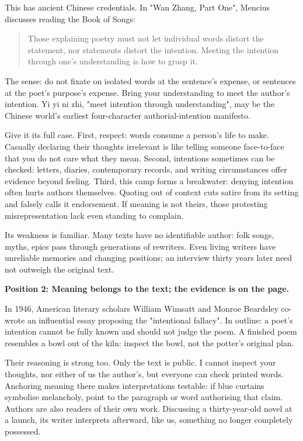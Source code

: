 This has ancient Chinese credentials. In "Wan Zhang, Part One", Mencius discusses reading the Book of Songs:

\begin{quote}
Those explaining poetry must not let individual words distort the statement, nor statements distort the intention. Meeting the intention through one's understanding is how to grasp it.
\end{quote}
The sense: do not fixate on isolated words at the sentence's expense, or sentences at the poet's purpose's expense. Bring your understanding to meet the author's intention. Yi yi ni zhi, "meet intention through understanding", may be the Chinese world's earliest four-character authorial-intention manifesto.

Give it its full case. First, respect: words consume a person's life to make. Casually declaring their thoughts irrelevant is like telling someone face-to-face that you do not care what they mean. Second, intentions sometimes can be checked: letters, diaries, contemporary records, and writing circumstances offer evidence beyond feeling. Third, this camp forms a breakwater: denying intention often hurts authors themselves. Quoting out of context cuts satire from its setting and falsely calls it endorsement. If meaning is not theirs, those protesting misrepresentation lack even standing to complain.

Its weakness is familiar. Many texts have no identifiable author: folk songs, myths, epics pass through generations of rewriters. Even living writers have unreliable memories and changing positions; an interview thirty years later need not outweigh the original text.

\textbf{Position 2: Meaning belongs to the text; the evidence is on the page.}

In 1946, American literary scholars William Wimsatt and Monroe Beardsley co-wrote an influential essay proposing the "intentional fallacy". In outline: a poet's intention cannot be fully known and should not judge the poem. A finished poem resembles a bowl out of the kiln: inspect the bowl, not the potter's original plan.

Their reasoning is strong too. Only the text is public. I cannot inspect your thoughts, nor either of us the author's, but everyone can check printed words. Anchoring meaning there makes interpretations testable: if blue curtains symbolise melancholy, point to the paragraph or word authorising that claim. Authors are also readers of their own work. Discussing a thirty-year-old novel at a launch, its writer interprets afterward, like us, something no longer completely possessed.

